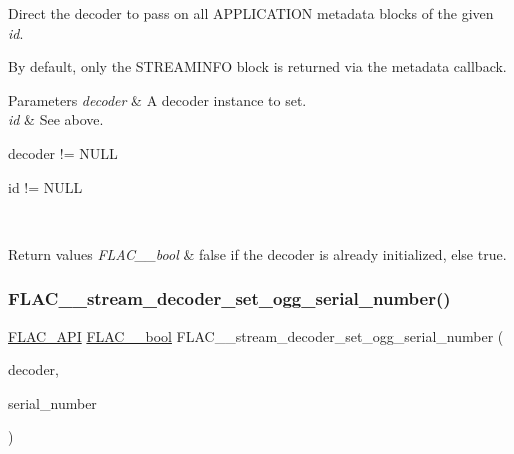 Direct the decoder to pass on all A\+P\+P\+L\+I\+C\+A\+T\+I\+ON metadata blocks of the given {\itshape id}.

By default, only the {\ttfamily S\+T\+R\+E\+A\+M\+I\+N\+FO} block is returned via the metadata callback. 
\begin{DoxyParams}{Parameters}
{\em decoder} & A decoder instance to set. \\
\hline
{\em id} & See above.  
\begin{DoxyCode}
decoder != NULL 
\end{DoxyCode}
 
\begin{DoxyCode}
\textcolor{keywordtype}{id} != NULL 
\end{DoxyCode}
 \\
\hline
\end{DoxyParams}

\begin{DoxyRetVals}{Return values}
{\em F\+L\+A\+C\+\_\+\+\_\+bool} & {\ttfamily false} if the decoder is already initialized, else {\ttfamily true}. \\
\hline
\end{DoxyRetVals}
\mbox{\label{group__flac__stream__decoder_ga7bb4d567a4a07c911a895b9cef7551d9}} 
\subsubsection{\texorpdfstring{F\+L\+A\+C\+\_\+\+\_\+stream\+\_\+decoder\+\_\+set\+\_\+ogg\+\_\+serial\+\_\+number()}{FLAC\_\_stream\_decoder\_set\_ogg\_serial\_number()}}
{\footnotesize\ttfamily \hyperlink{group__flac__export_ga56ca07df8a23310707732b1c0007d6f5}{F\+L\+A\+C\+\_\+\+A\+PI} \hyperlink{ordinals_8h_a95103469f1cbd78b8cf250194985b34e}{F\+L\+A\+C\+\_\+\+\_\+bool} F\+L\+A\+C\+\_\+\+\_\+stream\+\_\+decoder\+\_\+set\+\_\+ogg\+\_\+serial\+\_\+number (\begin{DoxyParamCaption}\item[{\hyperlink{struct_f_l_a_c_____stream_decoder}{F\+L\+A\+C\+\_\+\+\_\+\+Stream\+Decoder} $\ast$}]{decoder,  }\item[{long}]{serial\+\_\+number }\end{DoxyParamCaption})}

